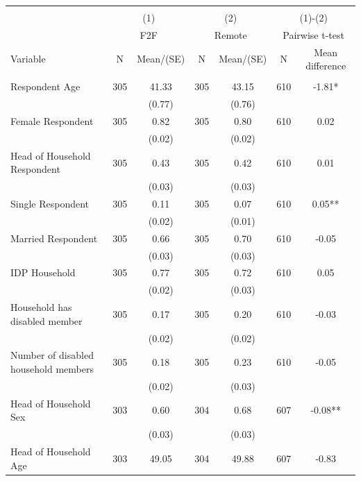 \begin{tabular}{@{\extracolsep{5pt}}lcccccc}
\\[-1.8ex]\hline \hline \\[-1.8ex]
 & \multicolumn{2}{c}{(1)}  & \multicolumn{2}{c}{(2)}  & \multicolumn{2}{c}{(1)-(2)} \\
 & \multicolumn{2}{c}{F2F}  & \multicolumn{2}{c}{Remote}  & \multicolumn{2}{c}{Pairwise t-test}  \\
Variable & N & Mean/(SE) & N & Mean/(SE) & N & Mean difference \\ \hline \\[-1.8ex] 
Respondent Age   & 305    & 41.33    & 305    & 43.15    & 610    & -1.81*   \\
 &   & (0.77)  &   & (0.76)  &   &  \\ [1ex]
Female Respondent   & 305    & 0.82    & 305    & 0.80    & 610    & 0.02   \\
 &   & (0.02)  &   & (0.02)  &   &  \\ [1ex]
Head of Household Respondent   & 305    & 0.43    & 305    & 0.42    & 610    & 0.01   \\
 &   & (0.03)  &   & (0.03)  &   &  \\ [1ex]
Single Respondent   & 305    & 0.11    & 305    & 0.07    & 610    & 0.05**   \\
 &   & (0.02)  &   & (0.01)  &   &  \\ [1ex]
Married Respondent   & 305    & 0.66    & 305    & 0.70    & 610    & -0.05   \\
 &   & (0.03)  &   & (0.03)  &   &  \\ [1ex]
IDP Household   & 305    & 0.77    & 305    & 0.72    & 610    & 0.05   \\
 &   & (0.02)  &   & (0.03)  &   &  \\ [1ex]
Household has disabled member   & 305    & 0.17    & 305    & 0.20    & 610    & -0.03   \\
 &   & (0.02)  &   & (0.02)  &   &  \\ [1ex]
Number of disabled household members   & 305    & 0.18    & 305    & 0.23    & 610    & -0.05   \\
 &   & (0.02)  &   & (0.03)  &   &  \\ [1ex]
Head of Household Sex   & 303    & 0.60    & 304    & 0.68    & 607    & -0.08**   \\
 &   & (0.03)  &   & (0.03)  &   &  \\ [1ex]
Head of Household Age   & 303    & 49.05    & 304    & 49.88    & 607    & -0.83   \\

\end{tabular}
